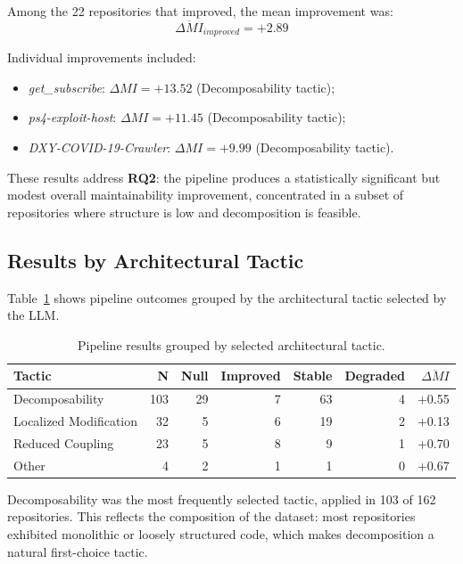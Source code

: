 Among the 22 repositories that improved, the mean improvement was:
\begin{equation}
\overline{\Delta MI}_{improved} = +2.89
\end{equation}

Individual improvements included:
\begin{itemize}
    \item \textit{get\_subscribe}: $\Delta MI = +13.52$ (Decomposability tactic);
    \item \textit{ps4-exploit-host}: $\Delta MI = +11.45$ (Decomposability tactic);
    \item \textit{DXY-COVID-19-Crawler}: $\Delta MI = +9.99$ (Decomposability tactic).
\end{itemize}

These results address \textbf{RQ2}: the pipeline produces a statistically significant but modest overall maintainability improvement, concentrated in a subset of repositories where structure is low and decomposition is feasible.

\subsection{Results by Architectural Tactic}
\label{subsec:eval_tactic_results}

Table~\ref{tab:eval_tactics} shows pipeline outcomes grouped by the architectural tactic selected by the LLM.

\begin{table}[H]
\centering
\small
\caption{Pipeline results grouped by selected architectural tactic.}
\label{tab:eval_tactics}
\begin{tabular}{lrrrrrr}
\toprule
\textbf{Tactic} & \textbf{N} & \textbf{Null} & \textbf{Improved} & \textbf{Stable} & \textbf{Degraded} & $\overline{\Delta MI}$ \\
\midrule
Decomposability & 103 & 29 & 7 & 63 & 4 & +0.55 \\
Localized Modification & 32 & 5 & 6 & 19 & 2 & +0.13 \\
Reduced Coupling & 23 & 5 & 8 & 9 & 1 & +0.70 \\
Other & 4 & 2 & 1 & 1 & 0 & +0.67 \\
\bottomrule
\end{tabular}
\end{table}

Decomposability was the most frequently selected tactic, applied in 103 of 162 repositories. This reflects the composition of the dataset: most repositories exhibited monolithic or loosely structured code, which makes decomposition a natural first-choice tactic.

